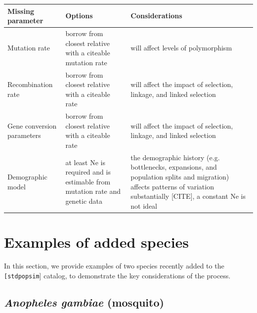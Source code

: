\documentclass[hidelinks]{article}
\newcommand{\stdpopsim}{\texttt{stdpopsim}\xspace}
\begin{document}
\begin{table}[htb]
	\captionof{table}{Guide to missing parameters. \\
	\colorbox{yellow}{[TODO: reconsider table. Either clarify considerations or just defer to the text, which covers this quite clearly.}
	\colorbox{yellow}{Current version is too vague.}
} \label{tab:param-mod}
	\begin{tabular}{p{1.5in}p{2.2in}p{2.2in}}
			\hline
			Missing parameter  & Options & Considerations \\
			\hline
			Mutation rate      &
			borrow from closest relative with a citeable mutation rate &
			will affect levels of polymorphism \\                                                                                          						\hline
			Recombination rate &
			borrow from closest relative with a citeable rate &
			will affect the impact of selection, linkage, and linked selection
			\\
			\hline
			Gene conversion parameters &
			borrow from closest relative with a citeable rate &
			will affect the impact of selection, linkage, and linked selection
			\\
			\hline
			Demographic model &
			at least Ne is required and is estimable from mutation rate and genetic data     &
			the demographic history (e.g. bottlenecks, expansions, and population splits and migration) affects patterns of variation substantially {[}CITE{]}, a constant Ne is not ideal \\
			\hline
	\end{tabular}
\end{table}


\hypertarget{sec5}{%
	\section*{Examples of added species}\label{sec:examples}}

In this section, we provide examples of two species recently added to the \texttt[\stdpopsim] catalog,
to demonstrate the key considerations of the process.

\hypertarget{ano-gambea}{%
	\subsection*{\texorpdfstring{\emph{Anopheles gambiae} (mosquito)}{Anopheles gambiae (mosquito)}}\label{AnoGam}}
\end{document}
